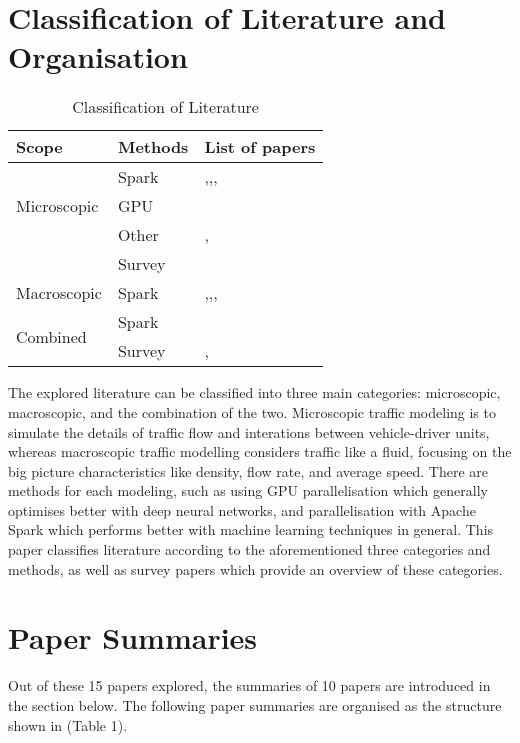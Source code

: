 \documentclass{article}
\begin{document}
\section{Classification of Literature and Organisation} %
\label{sec:classification}
\begin{table}[h]
\begin{tabular}{ |p{2cm}|p{2cm}||p{3.2cm}| }
    \hline
    Scope & Methods & List of papers\\
    \hline
    \multirow{3}{3em}{Microscopic} & Spark & \cite{10.1145/2820783.2820860},\cite{yu2020dissecting},\cite{10.1007/978-981-16-4126-8_24},\cite{9077707}
    \\
    & GPU & \cite{9075295}
    \\
    & Other & \cite{8569938},\cite{10.1145/3397536.3422274} 
    \\
    & Survey & \cite{gora2020microscopic}\\
    \hline
    Macroscopic & Spark & \cite{Sigurdsson2018RoadTC},\cite{Yang2019},\cite{FAN2019298},\cite{Zhang20231124}\\
    \hline
    \multirow{2}{2em}{Combined} & Spark & \cite{STARK}
    \\
    & Survey & \cite{10356753}, \cite{LI2020225}\\
    \hline
\end{tabular}
\caption{Classification of Literature}
\end{table}

The explored literature can be classified into three main categories: microscopic, macroscopic, and the combination of the two. Microscopic traffic modeling is to simulate the details of traffic flow and interations between vehicle-driver units, whereas macroscopic traffic modelling considers traffic like a fluid, focusing on the big picture characteristics like density, flow rate, and average speed. There are methods for each modeling, such as using GPU parallelisation which generally optimises better with deep neural networks, and parallelisation with Apache Spark which performs better with machine learning techniques in general. This paper classifies literature according to the aforementioned three categories and methods, as well as survey papers which provide an overview of these categories.

\section{Paper Summaries} %
\label{sec:summaries}
Out of these 15 papers explored, the summaries of 10 papers are introduced in the section below. The following paper summaries are organised as the structure shown in (Table 1). 
\end{document}
